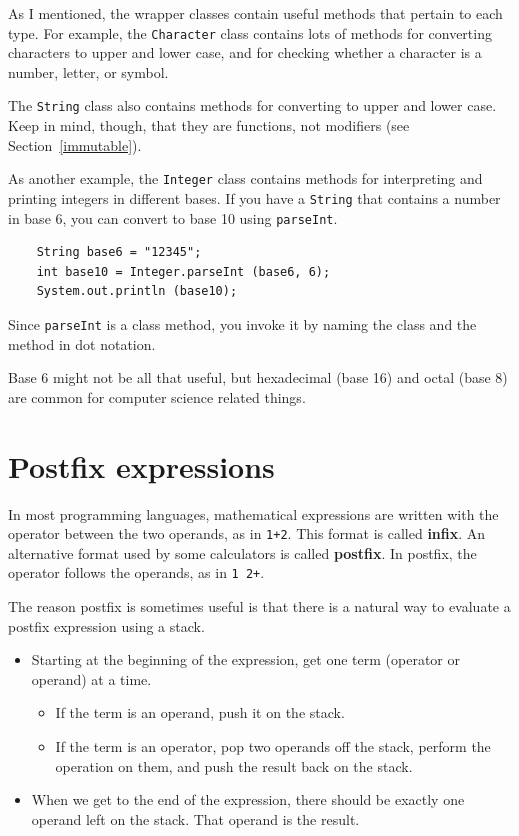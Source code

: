 \documentclass[12pt]{book}
\theoremstyle{exercise}
\begin{document}
As I mentioned, the wrapper classes contain useful methods that
pertain to each type.  For example, the {\tt Character} class contains
lots of methods for converting characters to upper and lower case, and
for checking whether a character is a number, letter, or symbol.

The {\tt String} class also contains methods for converting to upper
and lower case.  Keep in mind, though, that they are functions,
not modifiers (see Section~\ref{immutable}).

As another example, the {\tt Integer} class contains methods for
interpreting and printing integers in different bases.  If you have a
{\tt String} that contains a number in base 6, you can convert to base
10 using {\tt parseInt}.

\begin{verbatim}
    String base6 = "12345";
    int base10 = Integer.parseInt (base6, 6);
    System.out.println (base10);
\end{verbatim}
%
Since {\tt parseInt} is a class method, you invoke it by
naming the class and the method in dot notation.

Base 6 might not be all that useful, but hexadecimal
(base 16) and octal (base 8) are common for computer science
related things.


\section {Postfix expressions}

In most programming languages, mathematical expressions are
written with the operator between the two operands, as in
{\tt 1+2}.  This format is called {\bf infix}.  An alternative
format used by some calculators is called {\bf postfix}.  In
postfix, the operator follows the operands, as in {\tt 1 2+}.

The reason postfix is sometimes useful is that there is a
natural way to evaluate a postfix expression using a stack.

\begin{itemize}

\item Starting at the beginning of the expression, get one
term (operator or operand) at a time.

	\begin{itemize}

	\item If the term is an operand, push it on the stack.

	\item If the term is an operator, pop two operands off
	the stack, perform the operation on them, and push the
	result back on the stack.

	\end{itemize}

\item When we get to the end of the expression, there should
be exactly one operand left on the stack.  That operand is the
result.

\end{itemize}
\end{document}
